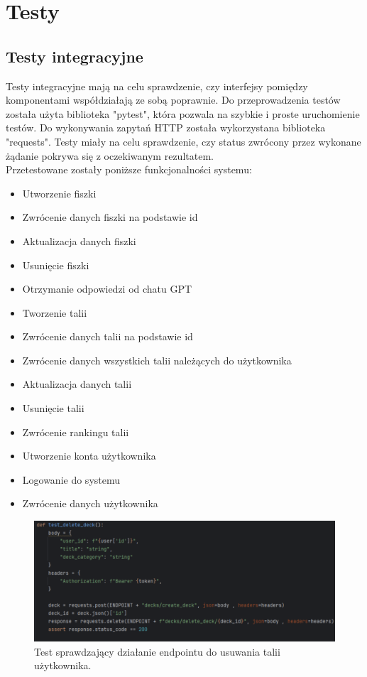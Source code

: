 \chapter{Testy}

\section{Testy integracyjne}

Testy integracyjne mają na celu sprawdzenie, czy interfejsy pomiędzy komponentami współdziałają ze sobą poprawnie\cite{mielnikIntegrationTests}. Do przeprowadzenia testów została użyta biblioteka "pytest", która pozwala na szybkie i proste uruchomienie testów. Do wykonywania zapytań HTTP została wykorzystana biblioteka "requests". Testy miały na celu sprawdzenie, czy status zwrócony przez wykonane żądanie pokrywa się z oczekiwanym rezultatem.\\
Przetestowane zostały poniższe funkcjonalności systemu:

\begin{itemize}
    \item Utworzenie fiszki
    \item Zwrócenie danych fiszki na podstawie id
    \item Aktualizacja danych fiszki
    \item Usunięcie fiszki
    \item Otrzymanie odpowiedzi od chatu GPT
    \item Tworzenie talii
    \item Zwrócenie danych talii na podstawie id
    \item Zwrócenie danych wszystkich talii należących do użytkownika
    \item Aktualizacja danych talii
    \item Usunięcie talii
    \item Zwrócenie rankingu talii
    \item Utworzenie konta użytkownika
    \item Logowanie do systemu
    \item Zwrócenie danych użytkownika
\end{itemize}

\begin{figure}[H]
    \centering
    \includegraphics[width=1\textwidth]{chapters/chapter_9/testy1}
    \caption{Test sprawdzający działanie endpointu do usuwania talii użytkownika.}
    \label{img:testy}
\end{figure}

